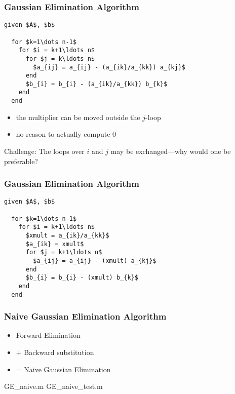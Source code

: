\documentclass[10pt]{beamer}
\begin{document}
\begin{frame}[fragile]
\frametitle{Gaussian Elimination Algorithm}

\begin{lstlisting}[mathescape,caption=Forward Elimination
beta,label=algo:fwdelimb]
  given $A$, $b$
                               
  for $k=1\dots n-1$          
    for $i = k+1\ldots n$      
      for $j = k\ldots n$      
        $a_{ij} = a_{ij} - (a_{ik}/a_{kk}) a_{kj}$
      end                      
      $b_{i} = b_{i} - (a_{ik}/a_{kk}) b_{k}$
    end                        
  end                          
\end{lstlisting}
\vspace{0.3cm}
\begin{itemize}
  \item the multiplier can be moved outside the $j$-loop
  \item no reason to actually compute 0
\end{itemize}
\begin{alertblock}{}
Challenge: The loops over $i$ and $j$ may be exchanged---why would one be 
preferable?
\end{alertblock}
\vfill

\end{frame}
\begin{frame}[fragile]
\frametitle{Gaussian Elimination Algorithm}

\begin{lstlisting}[mathescape,caption=Forward Elimination,label=algo:fwdelim]
  given $A$, $b$
                               
  for $k=1\dots n-1$          
    for $i = k+1\ldots n$      
      $xmult = a_{ik}/a_{kk}$
      $a_{ik} = xmult$
      for $j = k+1\ldots n$      
        $a_{ij} = a_{ij} - (xmult) a_{kj}$
      end                      
      $b_{i} = b_{i} - (xmult) b_{k}$
    end                        
  end                          
\end{lstlisting}
\vfill

\end{frame}
\begin{frame}[fragile]
\frametitle{Naive Gaussian Elimination Algorithm}

\begin{itemize}
  \item Forward Elimination
  \item + Backward substitution
  \item = Naive Gaussian Elimination
\end{itemize}
\vfill

\begin{example}
GE\_naive.m
GE\_naive\_test.m
\end{example}
\end{frame}
\end{document}
